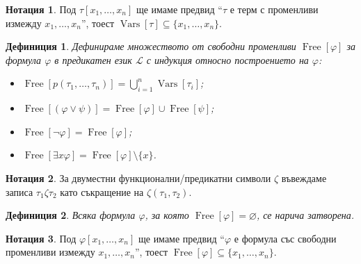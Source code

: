 \documentclass[12pt]{article}
\newcommand{\vars}{\operatorname{Vars}}
\newcommand{\free}{\operatorname{Free}}
\newcommand{\calL}{\mathcal{L}}
\newtheorem*{definition}{Дефиниция}
\theoremstyle{definition}
\newtheorem*{notation}{Нотация}
\begin{document}
\begin{notation}
    Под $\tau[x_1, \dots, x_n]$ ще имаме предвид ``$\tau$ е терм с променливи измежду $x_1, \dots, x_n$'', тоест $\vars[\tau] \subseteq \{ x_1, \dots, x_n \}$.
\end{notation}

\newpage

\begin{definition}
    Дефинираме множеството от свободни променливи $\free[\varphi]$ за формула $\varphi$ в предикатен език $\calL$ с индукция относно построението на $\varphi$:
    \begin{itemize}
        \item $\free[p(\tau_1, \dots, \tau_n)] = \bigcup\limits_{i = 1}^n \vars[\tau_i]$;
        \item $\free[(\varphi \lor \psi)] = \free[\varphi] \cup \free[\psi]$;
        \item $\free[\neg \varphi] = \free[\varphi]$;
        \item $\free[\exists x \varphi] = \free[\varphi] \setminus \{ x \}$.
    \end{itemize}
\end{definition}

\begin{notation}
    За двуместни функционални/предикатни символи $\zeta$ въвеждаме записа $\tau_1 \zeta \tau_2$ като съкращение на $\zeta(\tau_1, \tau_2)$.
\end{notation}

\begin{definition}
    Всяка формула $\varphi$, за която $\free[\varphi] = \varnothing$, се нарича затворена.
\end{definition}

\begin{notation}
    Под $\varphi[x_1, \dots, x_n]$ ще имаме предвид ``$\varphi$ е формула със свободни променливи измежду $x_1, \dots, x_n$'', тоест $\free[\varphi] \subseteq \{ x_1, \dots, x_n \}$.
\end{notation}
\end{document}
